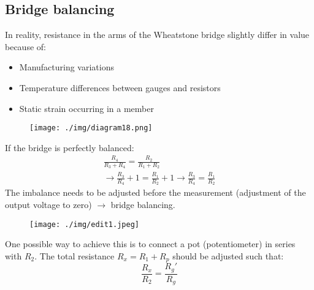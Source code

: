 \subsection{Bridge balancing}
In reality, resistance in the arms of the Wheatstone bridge slightly differ in value because of:
\begin{itemize}
  \item Manufacturing variations
  \item Temperature differences between gauges and resistors
  \item Static strain occurring in a member
\end{itemize}
\begin{figure}[H]
  \centering
  \texttt{[image: ./img/diagram18.png]}
\end{figure}
If the bridge is perfectly balanced:
\begin{gather}
  \frac{R_4}{R_3 + R_4} = \frac{R_2}{R_1 +R_2}\\
  \rightarrow \frac{R_3}{R_4} + 1 = \frac{R_1}{R_2} +1 \rightarrow \frac{R_3}{R_4} = \frac{R_1}{R_2}
\end{gather}
The imbalance needs to be adjusted before the measurement (adjustment of the output voltage to zero) $\rightarrow$ bridge balancing.
\begin{figure}[H]
  \centering
  \texttt{[image: ./img/edit1.jpeg]}
\end{figure}
One possible way to achieve this is to connect a pot (potentiometer) in series with $R_2$. The total resistance $R_x = R_1 + R_p$ should be adjusted such that:
\begin{equation}
  \frac{R_x}{R_2} = \frac{R_g'}{R_g}
\end{equation}
